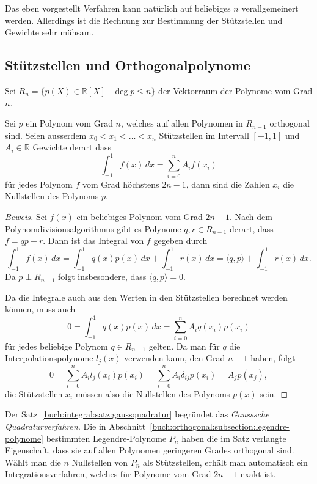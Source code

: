 Das eben vorgestellt Verfahren kann natürlich auf beliebiges $n$
verallgemeinert werden.
Allerdings ist die Rechnung zur Bestimmung der Stützstellen und
Gewichte sehr mühsam.

\subsection{Stützstellen und Orthogonalpolynome}
Sei $R_n=\{p(X)\in\mathbb{R}[X] \mid \deg p\le n\}$ der Vektorraum
der Polynome vom Grad $n$.

\begin{satz}
\label{buch:integral:satz:gaussquadratur}
Sei $p$ ein Polynom vom Grad $n$, welches auf allen Polynomen in $R_{n-1}$
orthogonal sind.
Seien ausserdem $x_0<x_1<\dots<x_n$ Stützstellen im Intervall $[-1,1]$ 
und $A_i\in\mathbb{R}$ Gewichte derart dass
\[
\int_{-1}^1 f(x)\,dx =
\sum_{i=0}^n A_if(x_i)
\]
für jedes Polynom $f$ vom Grad höchstens $2n-1$, dann sind die Zahlen
$x_i$ die Nullstellen des Polynoms $p$.
\end{satz}

\begin{proof}[Beweis]
Sei $f(x)$ ein beliebiges Polynom vom Grad $2n-1$.
Nach dem Polynomdivisionsalgorithmus gibt es
Polynome $q,r\in R_{n-1}$ derart, dass $f=qp+r$.
Dann ist das Integral von $f$ gegeben durch
\[
\int_{-1}^1 f(x)\,dx
=
\int_{-1}^1q(x) p(x)\,dx + \int_{-1}^1 r(x)\,dx
=
\langle q,p\rangle + \int_{-1}^1 r(x)\,dx.
\]
Da $p\perp R_{n-1}$ folgt insbesondere, dass $\langle q,p\rangle=0$.

Da die Integrale auch aus den Werten in den Stützstellen berechnet
werden können, muss auch
\[
0
=
\int_{-1}^1 q(x)p(x)\,dx
=
\sum_{i=0}^n A_iq(x_i)p(x_i)
\]
für jedes beliebige Polynom $q\in R_{n-1}$ gelten.
Da man für $q$ die Interpolationspolynome $l_j(x)$ verwenden
kann, den Grad $n-1$ haben, folgt
\[
0
=
\sum_{i=0}^n
A_il_j(x_i)p(x_i)
=
\sum_{i=0}^n A_i\delta_{ij}p(x_i)
=
A_jp(x_j),
\]
die Stützstellen $x_i$ müssen also die Nullstellen des Polynoms
$p(x)$ sein.
\end{proof}

Der Satz~\ref{buch:integral:satz:gaussquadratur} begründet das
{\em Gausssche Quadraturverfahren}.
Die in Abschnitt~\ref{buch:orthogonal:subsection:legendre-polynome}
bestimmten Legendre-Polynome $P_n$ haben die im Satz
verlangte Eigenschaft,
dass sie auf allen Polynomen geringeren Grades orthogonal sind.
Wählt man die $n$ Nullstellen von $P_n$ als Stützstellen, erhält man 
automatisch ein Integrationsverfahren, welches für Polynome vom Grad
$2n-1$ exakt ist.

